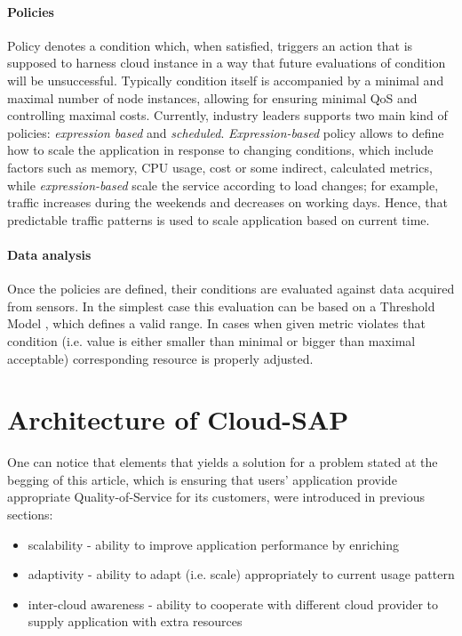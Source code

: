 \documentclass[twocolumn]{svjour3}          %
\begin{document}
\paragraph{Policies} Policy denotes a condition which, when satisfied, triggers an action that is supposed to harness cloud instance in a way that future evaluations of condition will be unsuccessful. Typically condition itself is accompanied by a minimal and maximal number of node instances, allowing for ensuring minimal QoS and controlling maximal costs. Currently, industry leaders supports two main kind of policies: \emph{expression based} and \emph{scheduled}. \emph{Expression-based} policy allows to define how to scale the application in response to changing conditions, which include factors such as memory, CPU usage, cost or some indirect, calculated metrics, while \emph{expression-based} scale the service according to load changes; for example, traffic increases during the weekends and decreases on working days. Hence, that predictable traffic patterns is used to scale application based on current time.

\paragraph{Data analysis}
Once the policies are defined, their conditions are evaluated against data acquired from sensors. In the simplest case this evaluation can be based on a Threshold Model \cite{LiWoZh05}, which defines a valid range. In cases when given metric violates that condition (i.e. value is either smaller than minimal or bigger than maximal acceptable) corresponding resource is properly adjusted.


\section{Architecture of Cloud-SAP}

One can notice that elements that yields a solution for a problem stated at the begging of this article, which is ensuring that users' application provide appropriate Quality-of-Service for its customers, were introduced in previous sections:
\begin{itemize}
	\item scalability - ability to improve application performance by enriching 
	\item adaptivity - ability to adapt (i.e. scale) appropriately to current usage pattern
	\item inter-cloud awareness - ability to cooperate with different cloud provider to supply application with extra resources
\end{itemize}
\end{document}
